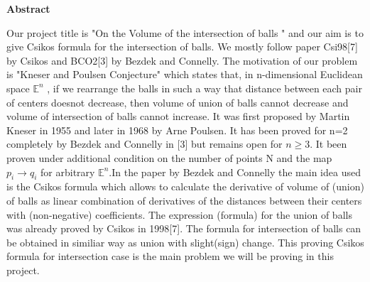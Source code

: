 \fancyhf{} %
\fancyhead[RO,R]{\thepage} %
\renewcommand{\headrulewidth}{0pt}

    \textbf{Abstract}
    
Our project title is "On the Volume of the intersection of balls " and our aim is to give Csikos formula for the intersection of balls. We mostly follow paper Csi98[7] by Csikos and BCO2[3] by Bezdek and Connelly.
The motivation of our problem is "Kneser and Poulsen Conjecture" which states that, in n-dimensional Euclidean space  $ \mathbb{E}^n$ , if we rearrange the   balls in such a way that distance between each pair of centers doesnot decrease, then volume of union of balls cannot decrease and volume of intersection of balls cannot increase. It was first proposed by Martin Kneser in 1955 and later in 1968 by Arne Poulsen. It has been proved for n=2 completely by Bezdek and Connelly in [3] but remains open for $n \geq 3$. It been proven under additional condition on the number of points N and the map $p_i \rightarrow q_i$  for arbitrary $\mathbb{E}^n$.In the paper by Bezdek and Connelly the main idea used is the Csikos formula which allows to calculate the derivative of volume of (union\intersection) of balls as linear combination of derivatives of the distances between their centers with (non-negative\negative) coefficients. The expression (formula) for the union of balls was already proved by Csikos in 1998[7]. The formula for intersection of balls can be obtained in similiar way as union with slight(sign) change. This proving Csikos formula for intersection case is the main problem we will be proving in this project.


